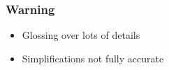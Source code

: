 \documentclass[compress,t]{beamer}
\begin{document}

\begin{frame}
  \frametitle{Warning}

  \vfill
  \begin{center}
    \begin{minipage}{0.55\textwidth}
    \begin{itemize}
      \item Glossing over lots of details
      \item Simplifications not fully accurate
    \end{itemize}
    \end{minipage}
  \end{center}
\end{frame}
\end{document}
